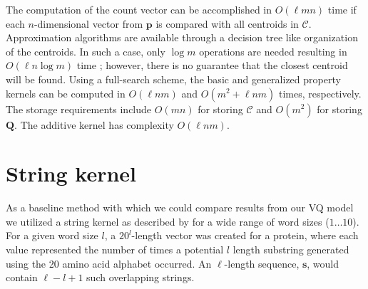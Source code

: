The computation of the count vector can be accomplished in $O(\ell mn)$ time if each $n$-dimensional vector from $\mathbf{p}$ is compared with all centroids in $\mathcal{C}$. Approximation algorithms are available through a decision tree like organization of the centroids. In such a case, only $\log m$ operations are needed resulting in $O(\ell n\log m)$ time \citep{gersho1992vector}; however, there is no guarantee that the closest centroid will be found. Using a full-search scheme, the basic and generalized property kernels can be computed in $O(\ell nm)$ and $O(m^{2}+\ell nm)$ times, respectively. The storage requirements include $O(mn)$ for storing $\mathcal{C}$ and $O(m^{2})$ for storing \textbf{$\mathbf{Q}$}. The additive kernel has complexity $O(\ell nm)$.

\section{String kernel}

As a baseline method with which we could compare results from our VQ model we utilized a string kernel as described by \cite{Leslie2002} for a wide range of word sizes ($1\dots 10$).  For a given word size $l$, a $20^{l}$-length vector was created for a protein, where each value represented the number of times a potential $l$ length substring generated using the 20 amino acid alphabet occurred.  An $\ell$-length sequence, $\mathbf{s}$, would contain $\ell-l+1$ such overlapping strings.



